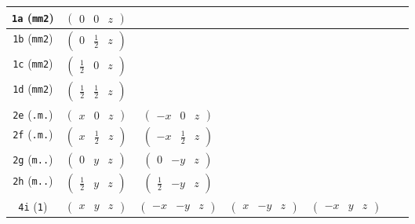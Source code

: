 \documentclass[fleqn,9pt,landscape]{jsarticle}
\begin{document}
\begin{center}
\begin{longtable}{ccccccc}
{\tt 1a} ({\tt mm2}) & $ \begin{pmatrix} 0 & 0 & z \end{pmatrix} $ & $  $ & $  $ & $  $ \\ \hline
{\tt 1b} ({\tt mm2}) & $ \begin{pmatrix} 0 & \frac{1}{2} & z \end{pmatrix} $ & $  $ & $  $ & $  $ \\ \hline
{\tt 1c} ({\tt mm2}) & $ \begin{pmatrix} \frac{1}{2} & 0 & z \end{pmatrix} $ & $  $ & $  $ & $  $ \\ \hline
{\tt 1d} ({\tt mm2}) & $ \begin{pmatrix} \frac{1}{2} & \frac{1}{2} & z \end{pmatrix} $ & $  $ & $  $ & $  $ \\ \hline
{\tt 2e} ({\tt .m.}) & $ \begin{pmatrix} x & 0 & z \end{pmatrix} $ & $ \begin{pmatrix} - x & 0 & z \end{pmatrix} $ & $  $ & $  $ \\ \hline
{\tt 2f} ({\tt .m.}) & $ \begin{pmatrix} x & \frac{1}{2} & z \end{pmatrix} $ & $ \begin{pmatrix} - x & \frac{1}{2} & z \end{pmatrix} $ & $  $ & $  $ \\ \hline
{\tt 2g} ({\tt m..}) & $ \begin{pmatrix} 0 & y & z \end{pmatrix} $ & $ \begin{pmatrix} 0 & - y & z \end{pmatrix} $ & $  $ & $  $ \\ \hline
{\tt 2h} ({\tt m..}) & $ \begin{pmatrix} \frac{1}{2} & y & z \end{pmatrix} $ & $ \begin{pmatrix} \frac{1}{2} & - y & z \end{pmatrix} $ & $  $ & $  $ \\ \hline
{\tt 4i} ({\tt 1}) & $ \begin{pmatrix} x & y & z \end{pmatrix} $ & $ \begin{pmatrix} - x & - y & z \end{pmatrix} $ & $ \begin{pmatrix} x & - y & z \end{pmatrix} $ & $ \begin{pmatrix} - x & y & z \end{pmatrix} $ \\
\end{longtable}
\end{center}
\end{document}
